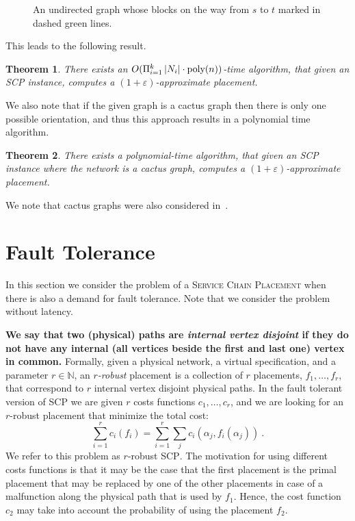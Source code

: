 \documentclass[11pt]{article}
\newcommand{\fix}[1]{{\color{purple}\textbf{#1}}}
\newtheorem{theorem}{Theorem}
\newcommand{\abs}[1]{\left| #1 \right|}
\newcommand{\naturals}{\mathbb{N}}
\newcommand{\eps}{\varepsilon}
\newcommand{\scp}{\textsc{SCP}\xspace}
\begin{document}
\begin{figure}[t]
\begin{center}

\end{center}
\caption{An undirected graph whose blocks on the way from $s$ to $t$
  marked in dashed green lines.
\label{fig:or2}
}
\end{figure}   

This leads to the following result.

\begin{theorem}
There exists an $O(\Pi_{i = 1}^k \abs{N_i} \cdot \text{\rm
  poly}(n))$-time algorithm, that given an \scp instance, computes a
$(1+\eps)$-approximate placement.
\end{theorem}

We also note that if the given graph is a cactus graph then there is
only one possible orientation, and thus this approach results in a
polynomial time algorithm.

\begin{theorem}
There exists a polynomial-time algorithm, that given an \scp instance
where the network is a cactus graph, computes a $(1+\eps)$-approximate
placement.
\end{theorem}

We note that cactus graphs were also considered in~\cite{FPS17}.


\section{Fault Tolerance}

In this section we consider the problem of a \textsc{Service Chain
  Placement} when there is also a demand for fault tolerance.  Note
that we consider the problem without latency.

\fix{We say that two (physical) paths are \emph{internal vertex disjoint} if they do not have any internal (all vertices beside the first and last one) vertex in common.}
Formally, given a physical network, a virtual specification, and a
parameter $r \in \naturals$, an \emph{$r$-robust} placement is a
collection of $r$ placements, $f_1,\ldots,f_r$, that correspond to $r$
internal vertex disjoint physical paths.  In the fault tolerant
version of \scp we are given $r$ costs functions $c_1,\ldots,c_r$, and
we are looking for an $r$-robust placement that minimize the total
cost:
\[
\sum_{i=1}^r c_i(f_i) = \sum_{i = 1}^r \sum_j c_i(\alpha_j,f_i(\alpha_j))
~.
\]
We refer to this problem as $r$-robust \scp.
%
The motivation for using different costs functions is that it may be
the case that the first placement is the primal placement that may be
replaced by one of the other placements in case of a malfunction along
the physical path that is used by $f_1$.  Hence, the cost function
$c_2$ may take into account the probability of using the placement
$f_2$.
\end{document}
